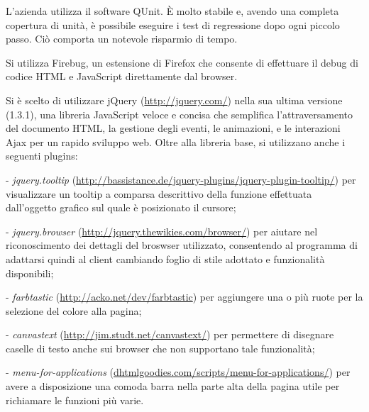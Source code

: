 L'azienda utilizza il software QUnit. \`E molto stabile e, avendo una completa copertura di unit\`a,  \`e possibile eseguire i test di regressione dopo ogni piccolo passo. Ci\`o comporta un notevole risparmio di tempo.

Si utilizza Firebug, un estensione di Firefox che consente di effettuare il debug di codice HTML e JavaScript direttamente dal browser.

Si \` e scelto di utilizzare jQuery (\href{http://jquery.com/}{http://jquery.com/}) nella sua ultima versione (1.3.1), una libreria JavaScript veloce e concisa che semplifica l'attraversamento del documento HTML, la gestione degli eventi, le animazioni, e le interazioni Ajax per un rapido sviluppo web. Oltre alla libreria base, si utilizzano anche i seguenti plugins:
 \begin{elencopuntato}[\normindent]
    \item[-] \textit{jquery.tooltip}  (\href{http://bassistance.de/jquery-plugins/jquery-plugin-tooltip/}{http://bassistance.de/jquery-plugins/jquery-plugin-tooltip/}) per visualizzare un tooltip a comparsa descrittivo della funzione effettuata dall'oggetto grafico sul quale \` e posizionato il cursore;
    \item[-]\textit{jquery.browser}  (\href{http://jquery.thewikies.com/browser/}{http://jquery.thewikies.com/browser/}) per aiutare nel riconoscimento dei dettagli del broswser utilizzato, consentendo al programma di adattarsi quindi al client cambiando foglio di stile adottato e funzionalit\` a disponibili;
    \item[-]\textit{farbtastic} (\href{http://acko.net/dev/farbtastic}{http://acko.net/dev/farbtastic}) per aggiungere una o pi\` u ruote per la selezione del colore alla pagina;
    \item[-]\textit{canvastext} (\href{http://jim.studt.net/canvastext/}{http://jim.studt.net/canvastext/}) per permettere di disegnare caselle di testo anche sui browser che non supportano tale funzionalit\` a;
     \item[-]\textit{menu-for-applications} (\href{http://www.dhtmlgoodies.com/scripts/menu-for-applications/demos/demo-menu-bar.html}{dhtmlgoodies.com/scripts/menu-for-applications/}) per avere a disposizione una comoda barra nella parte alta della pagina utile per richiamare le funzioni pi\` u varie.
  \end{elencopuntato}
  
